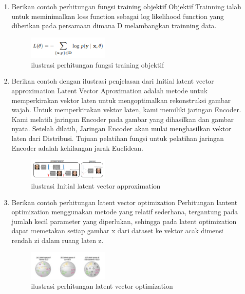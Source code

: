 \begin{enumerate}
    \item Berikan contoh perhitungan fungsi training objektif
    \hfill\break
    Objektif Trainning ialah untuk meminimalkan loss function sebagai log likelihood function yang diberikan pada persamaan dimana D melambangkan trainning data.
    \begin{figure}[H]
	    \centering
	    \includegraphics[width=4cm]{figures/1174096/tugas9/teori9.PNG}
	    \caption{ilustrasi perhitungan fungsi training objektif}
    \end{figure}
    

    \item Berikan contoh dengan ilustrasi penjelasan dari Initial latent vector approximation
    \hfill\break
    Latent Vector Aproximation adalah metode untuk memperkirakan vektor laten untuk mengoptimalkan rekonstruksi gambar wajah. Untuk memperkirakan vektor laten, kami memiliki jaringan Encoder. Kami melatih jaringan Encoder pada gambar yang dihasilkan dan gambar nyata. Setelah dilatih, Jaringan Encoder akan mulai menghasilkan vektor laten dari Distribusi. Tujuan pelatihan fungsi untuk pelatihan jaringan Encoder adalah kehilangan jarak Euclidean.
    \begin{figure}[H]
	    \centering
	    \includegraphics[width=4cm]{figures/1174096/tugas9/teori10.PNG}
	    \caption{ilustrasi Initial latent vector approximation}
    \end{figure}

    \item Berikan contoh perhitungan latent vector optimization
    \hfill\break
    Perhitungan lantent optimization menggunakan metode yang relatif sederhana, tergantung pada jumlah kecil parameter yang diperlukan, sehingga pada latent optimization dapat memetakan setiap gambar x dari dataset ke vektor acak dimensi rendah zi dalam ruang laten z.
    \begin{figure}[H]
	    \centering
	    \includegraphics[width=4cm]{figures/1174096/tugas9/teori11.PNG}
	    \caption{ilustrasi perhitungan latent vector optimization}
    \end{figure}

\end{enumerate}

